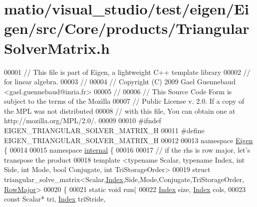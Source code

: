 \hypertarget{matio_2visual__studio_2test_2eigen_2_eigen_2src_2_core_2products_2_triangular_solver_matrix_8h_source}{}\section{matio/visual\+\_\+studio/test/eigen/\+Eigen/src/\+Core/products/\+Triangular\+Solver\+Matrix.h}
\label{matio_2visual__studio_2test_2eigen_2_eigen_2src_2_core_2products_2_triangular_solver_matrix_8h_source}

\begin{DoxyCode}
00001 \textcolor{comment}{// This file is part of Eigen, a lightweight C++ template library}
00002 \textcolor{comment}{// for linear algebra.}
00003 \textcolor{comment}{//}
00004 \textcolor{comment}{// Copyright (C) 2009 Gael Guennebaud <gael.guennebaud@inria.fr>}
00005 \textcolor{comment}{//}
00006 \textcolor{comment}{// This Source Code Form is subject to the terms of the Mozilla}
00007 \textcolor{comment}{// Public License v. 2.0. If a copy of the MPL was not distributed}
00008 \textcolor{comment}{// with this file, You can obtain one at http://mozilla.org/MPL/2.0/.}
00009 
00010 \textcolor{preprocessor}{#ifndef EIGEN\_TRIANGULAR\_SOLVER\_MATRIX\_H}
00011 \textcolor{preprocessor}{#define EIGEN\_TRIANGULAR\_SOLVER\_MATRIX\_H}
00012 
00013 \textcolor{keyword}{namespace }\hyperlink{namespace_eigen}{Eigen} \{ 
00014 
00015 \textcolor{keyword}{namespace }\hyperlink{namespaceinternal}{internal} \{
00016 
00017 \textcolor{comment}{// if the rhs is row major, let's transpose the product}
00018 \textcolor{keyword}{template} <\textcolor{keyword}{typename} Scalar, \textcolor{keyword}{typename} Index, \textcolor{keywordtype}{int} S\textcolor{keywordtype}{id}e, \textcolor{keywordtype}{int} Mode, \textcolor{keywordtype}{bool} Conjugate, \textcolor{keywordtype}{int} TriStorageOrder>
00019 \textcolor{keyword}{struct }triangular\_solve\_matrix<Scalar,\hyperlink{namespace_eigen_a62e77e0933482dafde8fe197d9a2cfde}{Index},Side,Mode,Conjugate,TriStorageOrder,
      \hyperlink{group__enums_ggaacded1a18ae58b0f554751f6cdf9eb13acfcde9cd8677c5f7caf6bd603666aae3}{RowMajor}>
00020 \{
00021   \textcolor{keyword}{static} \textcolor{keywordtype}{void} run(
00022     \hyperlink{namespace_eigen_a62e77e0933482dafde8fe197d9a2cfde}{Index} size, \hyperlink{namespace_eigen_a62e77e0933482dafde8fe197d9a2cfde}{Index} cols,
00023     \textcolor{keyword}{const} Scalar*  tri, \hyperlink{namespace_eigen_a62e77e0933482dafde8fe197d9a2cfde}{Index} triStride,

\end{DoxyCode}
